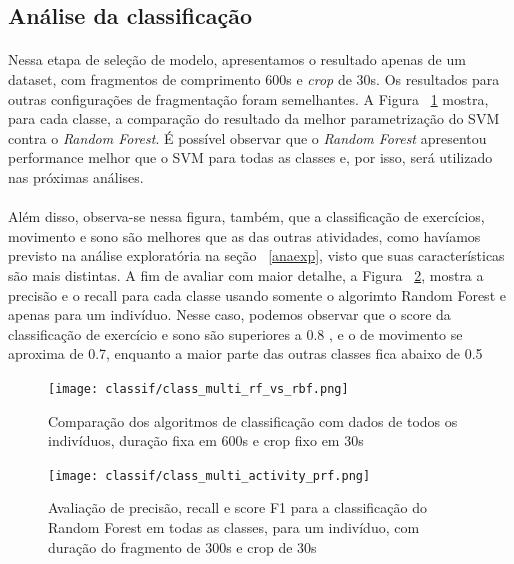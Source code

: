        \subsection{Análise da classificação}
        
            \paragraph{} Nessa etapa de seleção de modelo, apresentamos o resultado apenas de um dataset, com fragmentos de comprimento 600s e \textit{crop} de 30s. Os resultados para outras configurações de fragmentação foram semelhantes. A Figura ~\ref{svmvsrf} mostra, para cada classe, a comparação do resultado da melhor parametrização do SVM contra o \textit{Random Forest}. É possível observar que o \textit{ Random Forest} apresentou performance melhor que o SVM para todas as classes e, por isso, será utilizado nas próximas análises. 
            
            \paragraph{} Além disso, observa-se nessa figura, também, que a classificação de exercícios, movimento e sono são melhores que as das outras atividades, como havíamos previsto na análise exploratória na seção ~\ref{anaexp}, visto que suas características são mais distintas. A fim de avaliar com maior detalhe, a Figura ~\ref{multiclass_prf}, mostra a precisão e o recall para cada classe usando somente o algorimto Random Forest e apenas para um indivíduo. Nesse caso, podemos observar que o score da classificação de exercício e sono são superiores a 0.8 , e o de movimento se aproxima de 0.7, enquanto a maior parte das outras classes fica abaixo de 0.5
            
            \begin{figure}[h!]
            	\centering
            	\texttt{[image: classif/class\_multi\_rf\_vs\_rbf.png]}
            	\caption{Comparação dos algoritmos de classificação com dados de todos os indivíduos, duração fixa em 600s e crop fixo em 30s}
                \label{svmvsrf}
            \end{figure}
            
            \begin{figure}[h!]
            	\centering
            	\texttt{[image: classif/class\_multi\_activity\_prf.png]}
            	\caption{Avaliação de precisão, recall e score F1 para a classificação do Random Forest em todas as classes, para um indivíduo, com duração do fragmento de 300s e crop de 30s}
                \label{multiclass_prf}
            \end{figure}
            
